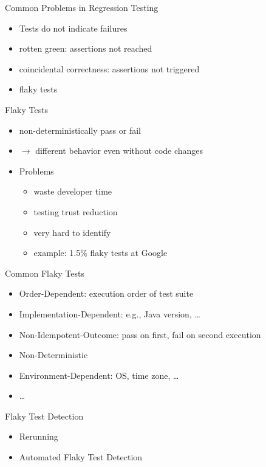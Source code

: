 \begin{frame}[fragile]{\insertsubsection}
	\begin{fancycolumns}[animation=none]
		\begin{note}{Common Problems in Regression Testing}
			\begin{itemize}
				\item Tests do not indicate failures
				\item rotten green: assertions not reached
				\item coincidental correctness: assertions not triggered
				\item flaky tests
			\end{itemize}
		\end{note}
		\begin{definition}{Flaky Tests}
			\begin{itemize}
				\item non-deterministically pass or fail
				\item $\rightarrow$ different behavior even without code changes
				\item Problems
				\begin{itemize}
					\item waste developer time
					\item testing trust reduction
					\item very hard to identify
					\item example: 1.5\% flaky tests at Google
				\end{itemize}
			\end{itemize}
		\end{definition}\pause
		\nextcolumn
		\begin{note}{Common Flaky Tests \mysource{\idoft}}
			\begin{itemize}
				\item Order-Dependent: execution order of test suite
				\item Implementation-Dependent: e.g., Java version, \dots
				\item Non-Idempotent-Outcome: pass on first, fail on second execution
				\item Non-Deterministic
				\item Environment-Dependent: OS, time zone, \dots
				\item \dots
			\end{itemize} 
		\end{note}
		\pause
		\begin{note}{Flaky Test Detection}
			\begin{itemize}
				\item Rerunning
				\item Automated Flaky Test Detection
			\end{itemize}
		\end{note}
	\end{fancycolumns}
\end{frame}

